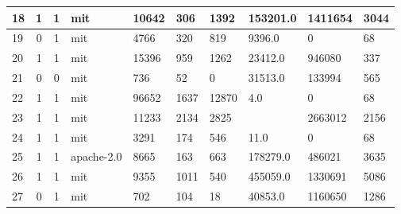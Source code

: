 \begin{landscape}
\begin{table}[h]
{\begin{tabular}{lcclllllll}
                18 & 1                          & 1                     & mit              & 10642            & 306                   & 1392                         & 153201.0        & 1411654            & 3044                \\ \hline
                19 & 0                          & 1                     & mit              & 4766             & 320                   & 819                          & 9396.0          & 0                  & 68                  \\ \hline
                20 & 1                          & 1                     & mit              & 15396            & 959                   & 1262                         & 23412.0         & 946080             & 337                 \\ \hline
                21 & 0                          & 0                     & mit              & 736              & 52                    & 0                            & 31513.0         & 133994             & 565                 \\ \hline
                22 & 1                          & 1                     & mit              & 96652            & 1637                  & 12870                        & 4.0             & 0                  & 68                  \\ \hline
                23 & 1                          & 1                     & mit              & 11233            & 2134                  & 2825                         &                 & 2663012            & 2156                \\ \hline
                24 & 1                          & 1                     & mit              & 3291             & 174                   & 546                          & 11.0            & 0                  & 68                  \\ \hline
                25 & 1                          & 1                     & apache-2.0       & 8665             & 163                   & 663                          & 178279.0        & 486021             & 3635                \\ \hline
                26 & 1                          & 1                     & mit              & 9355             & 1011                  & 540                          & 455059.0        & 1330691            & 5086                \\ \hline
                27 & 0                          & 1                     & mit              & 702              & 104                   & 18                           & 40853.0         & 1160650            & 1286                \\ \hline

\end{tabular}}
\end{table}
\end{landscape}
